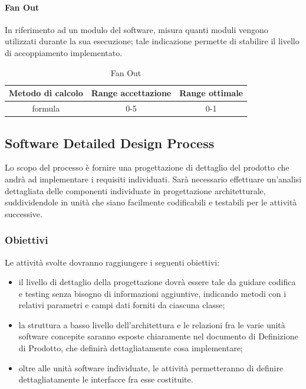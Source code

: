 			\paragraph{Fan Out}
			In riferimento ad un modulo del software, misura quanti moduli vengono utilizzati durante la
			sua esecuzione; tale indicazione permette di stabilire il livello di accoppiamento implementato.
			\begin{table}[H]
				\begin{center}
					\begin{tabular}{|c|c|c|}
						\hline
						\textbf{Metodo di calcolo} & \textbf{Range accettazione} & \textbf{Range ottimale} \\
						\hline
						formula & 0-5  & 0-1 \\
						\hline
					\end{tabular}
				\end{center}
				\caption{Fan Out}
			\end{table}
			
	
	\subsection{Software Detailed Design Process}
	Lo scopo del processo è fornire una progettazione di dettaglio del prodotto che andrà ad implementare
	i requisiti individuati.
	Sarà necessario effettuare un’analisi dettagliata delle componenti individuate in progettazione
	architetturale, suddividendole in unità che siano facilmente codificabili e testabili per le attività
	successive.
		\subsubsection{Obiettivi}
		Le attività svolte dovranno raggiungere i seguenti obiettivi:
		\begin{itemize}
			\item il livello di dettaglio della progettazione dovrà essere tale da guidare codifica e testing senza
			bisogno di informazioni aggiuntive, indicando metodi con i relativi parametri e campi dati
			forniti da ciascuna classe;
			\item la struttura a basso livello dell’architettura e le relazioni fra le varie unità software concepite
			saranno esposte chiaramente nel documento di Definizione di Prodotto, che definirà
			dettagliatamente cosa implementare;
			\item oltre alle unità software individuate, le attività permetteranno di definire dettagliatamente
			le interfacce fra esse costituite.
		\end{itemize}
		
